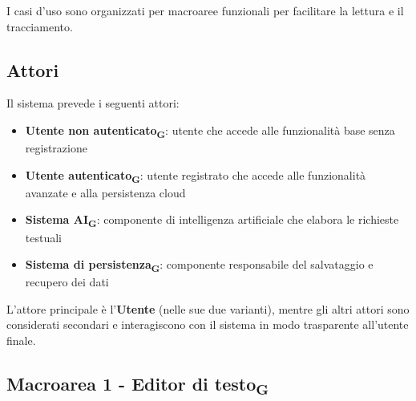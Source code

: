 \documentclass[11pt,a4paper]{article}
\newcommand{\gls}[1]{#1\textsubscript{G}}
\begin{document}
I casi d'uso sono organizzati per macroaree funzionali per facilitare la lettura e il tracciamento.

\subsection{Attori}
Il sistema prevede i seguenti attori:

\begin{itemize}
    \item \textbf{\gls{Utente non autenticato}}: utente che accede alle funzionalità base senza registrazione
    \item \textbf{\gls{Utente autenticato}}: utente registrato che accede alle funzionalità avanzate e alla persistenza cloud
    \item \textbf{\gls{Sistema AI}}: componente di intelligenza artificiale che elabora le richieste testuali
    \item \textbf{\gls{Sistema di persistenza}}: componente responsabile del salvataggio e recupero dei dati
\end{itemize}

L'attore principale è l'\textbf{Utente} (nelle sue due varianti), mentre gli altri attori sono considerati secondari e interagiscono con il sistema in modo trasparente all'utente finale.

\newpage

\subsection{Macroarea 1 - \gls{Editor di testo}}
\end{document}
